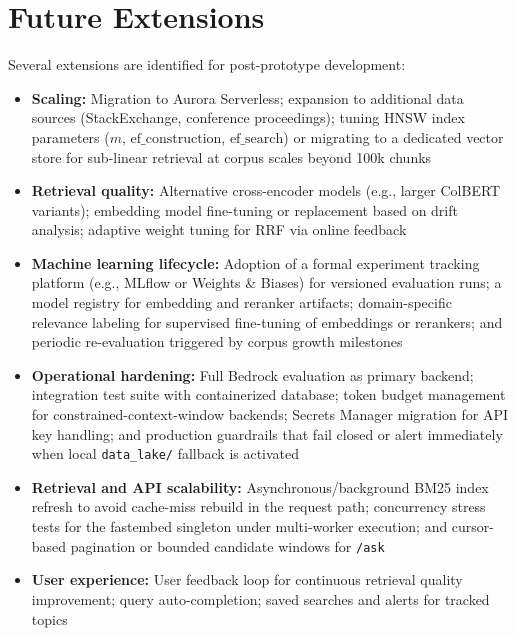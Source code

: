 \section{Future Extensions}
\label{sec:future}

Several extensions are identified for post-prototype development:

\begin{itemize}[leftmargin=0.5in]
  \item \textbf{Scaling:} Migration to Aurora Serverless; expansion to additional data sources (StackExchange, conference proceedings); tuning HNSW index parameters ($m$, $\text{ef\_construction}$, $\text{ef\_search}$) or migrating to a dedicated vector store for sub-linear retrieval at corpus scales beyond 100k chunks
  \item \textbf{Retrieval quality:} Alternative cross-encoder models (e.g., larger ColBERT variants); embedding model fine-tuning or replacement based on drift analysis; adaptive weight tuning for RRF via online feedback
  \item \textbf{Machine learning lifecycle:} Adoption of a formal experiment tracking platform (e.g., MLflow or Weights \& Biases) for versioned evaluation runs; a model registry for embedding and reranker artifacts; domain-specific relevance labeling for supervised fine-tuning of embeddings or rerankers; and periodic re-evaluation triggered by corpus growth milestones
  \item \textbf{Operational hardening:} Full Bedrock evaluation as primary backend; integration test suite with containerized database; token budget management for constrained-context-window backends; Secrets Manager migration for API key handling; and production guardrails that fail closed or alert immediately when local \texttt{data\_lake/} fallback is activated
  \item \textbf{Retrieval and API scalability:} Asynchronous/background BM25 index refresh to avoid cache-miss rebuild in the request path; concurrency stress tests for the fastembed singleton under multi-worker execution; and cursor-based pagination or bounded candidate windows for \texttt{/ask}
  \item \textbf{User experience:} User feedback loop for continuous retrieval quality improvement; query auto-completion; saved searches and alerts for tracked topics

\end{itemize}
